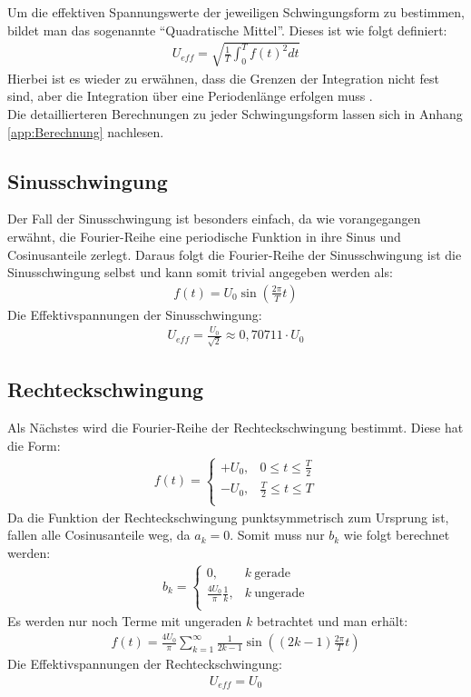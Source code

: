 Um die effektiven Spannungswerte der jeweiligen Schwingungsform zu bestimmen, bildet man das sogenannte \enquote{Quadratische Mittel}. Dieses ist wie folgt definiert:
\begin{gather}
    U_{eff} = \sqrt{\frac{1}{T}\int^T_0 f(t)^2 dt}
\end{gather}
Hierbei ist es wieder zu erwähnen, dass die Grenzen der Integration nicht fest sind, aber die Integration über eine Periodenlänge erfolgen muss \citep{messtechnik}.\\

Die detaillierteren Berechnungen zu jeder Schwingungsform lassen sich in Anhang \ref{app:Berechnung} nachlesen.

\subsection*{Sinusschwingung}
\label{sub:sinus}
Der Fall der Sinusschwingung ist besonders einfach, da wie vorangegangen erwähnt, die Fourier-Reihe eine periodische Funktion in ihre Sinus und Cosinusanteile zerlegt. Daraus folgt die Fourier-Reihe der Sinusschwingung ist die Sinusschwingung selbst und kann somit trivial angegeben werden als:
\begin{gather}
    \boxed{f(t) = U_0\sin(\frac{2\pi}{T} t)}
\end{gather}
Die Effektivspannungen der Sinusschwingung:
\begin{gather}
    \boxed{U_{eff}=\frac{U_0}{\sqrt{2}}\approx 0,70711 \cdot U_0}
\end{gather}

\subsection*{Rechteckschwingung}
\label{sub:square}
Als Nächstes wird die Fourier-Reihe der Rechteckschwingung bestimmt. Diese hat die Form:
\begin{gather}
    f(t) = 
    \begin{cases}
        +U_0, & 0 \leq t \leq \frac{T}{2} \\
        -U_0, & \frac{T}{2} \leq t \leq T \\
    \end{cases}
\end{gather}
Da die Funktion der Rechteckschwingung punktsymmetrisch zum Ursprung ist, fallen alle Cosinusanteile weg, da $a_k = 0$. Somit muss nur $b_k$ wie folgt berechnet werden:
\begin{gather}
    b_k =
    \begin{cases}
        0, & k~\text{gerade}\\
        \frac{4U_0}{\pi}\frac{1}{k}, & k~\text{ungerade}\\
    \end{cases}
\end{gather} 
Es werden nur noch Terme mit ungeraden $k$ betrachtet und man erhält:
\begin{gather}
    \boxed{f(t) = \frac{4U_0}{\pi} \sum^{\infty}_{k=1} \frac{1}{2k-1} \sin((2k-1)\frac{2\pi}{T}t)}
\end{gather}
Die Effektivspannungen der Rechteckschwingung:
\begin{gather}
    \boxed{U_{eff} = U_0}
\end{gather}
